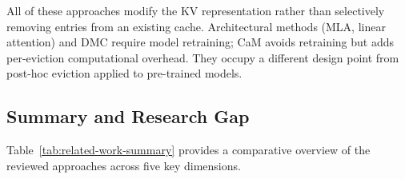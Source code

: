 \documentclass[
english,                 %
bibtex,                  %
]{kththesis}
\numberwithin{listing}{chapter}
\begin{document}
All of these approaches modify the \gls{KV} representation rather than selectively removing entries from an existing cache. Architectural methods (MLA, linear attention) and DMC require model retraining; CaM avoids retraining but adds per-eviction computational overhead. They occupy a different design point from post-hoc eviction applied to pre-trained models.

\subsection{Summary and Research Gap}
\label{sec:bg-summary}

Table~\ref{tab:related-work-summary} provides a comparative overview of the reviewed approaches across five key dimensions.

\begin{table}[!ht]
  \begin{center}
    \caption{Comparative summary of \gls{KV} cache optimization approaches. \textbf{Retraining}: requires model retraining or architectural change. \textbf{GPU-only}: operates entirely within \gls{GPU}-local memory without \gls{CPU} offloading. \textbf{Mem.\ Reclaim}: physically reclaims freed cache memory through in-place compaction. \textbf{System Eval}: includes system-level profiling or serving metrics (throughput, latency). A dash indicates the dimension is not evaluated.}
    \label{tab:related-work-summary}
\end{center}
\end{table}
\end{document}
